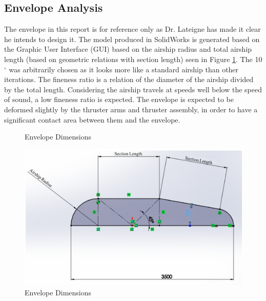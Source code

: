 \documentclass[../main.tex]{subfiles}
\begin{document}
	
\subsection{Envelope Analysis} \label{envelopeAnalysis}
The envelope in this report is for reference only as Dr. Lateigne has made it clear he intends to design it. The model produced in SolidWorks is generated based on the Graphic User Interface (GUI) based on the airship radius and total airship length (based on geometric relations with section length) seen in Figure \ref{fig:envelopeDimensions}. The 10$^{\circ}$ was arbitrarily chosen as it looks more like a standard airship than other iterations. The fineness ratio is a relation of the diameter of the airship divided by the total length. Considering the airship travels at speeds well below the speed of sound, a low fineness ratio is expected. The envelope is expected to be deformed slightly by the thruster arms and thruster assembly, in order to have a significant contact area between them and the envelope.

	\begin{figure}[H]
	\centering
	\caption{Envelope Dimensions}
	\includegraphics[width=.7\linewidth]{img/design/envelopeDimensions.png}
	\caption{Envelope Dimensions}
	\label{fig:envelopeDimensions}
\end{figure}
\end{document}
